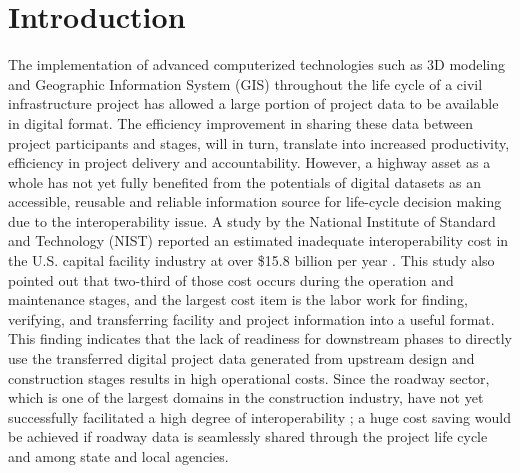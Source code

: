 \documentclass[Journal,InsideFigs, DoubleSpace]{ascelike} %
\begin{document}



\section{Introduction}%
The implementation of advanced computerized technologies such as 3D modeling and Geographic Information System (GIS) throughout the life cycle of a civil infrastructure project has allowed a large portion of project data to be available in digital format. The efficiency improvement in sharing these data between project participants and stages, will in turn, translate into increased productivity, efficiency in project delivery and accountability. However, a highway asset as a whole has not yet fully benefited from the potentials of digital datasets as an accessible, reusable and reliable information source for life-cycle decision making due to the interoperability issue. A study by the National Institute of Standard and Technology (NIST) reported an estimated inadequate interoperability cost in the U.S. capital facility industry at over \$15.8 billion per year \cite{Gallaher04}. This study also pointed out that two-third of those cost occurs during the operation and maintenance stages, and the largest cost item is the labor work for finding, verifying, and transferring facility and project information into a useful format. This finding indicates that the lack of readiness for downstream phases to directly use the transferred digital project data generated from upstream design and construction stages results in high operational costs. Since the roadway sector, which is one of the largest domains in the construction industry, have not yet successfully facilitated a high degree of interoperability \cite{lefler14}; a huge cost saving would be achieved if roadway data is seamlessly shared through the project life cycle and among state and local agencies.
\end{document}
